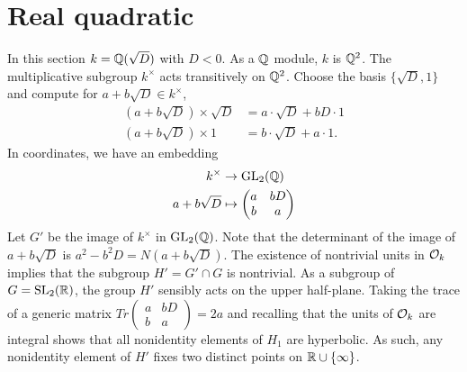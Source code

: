 \documentclass[11pt]{amsart}
\begin{document}
\section{Real quadratic}
In this section $k=\mathbb{Q}(\sqrt{D})$ with $D<0$. As a $\mathbb{Q}$ module, $k$ is $\mathbb{Q}^2$. The multiplicative subgroup $k^\times$ acts transitively on $\mathbb{Q}^2$. Choose the basis $\{\sqrt{D},1\}$ and compute for $a+b\sqrt{D}\in k^\times$,
\begin{align*}
(a+b\sqrt{D}) \times \sqrt{D}&= a\cdot \sqrt{D} + bD \cdot 1  \\
(a+b \sqrt{D}) \times 1        &=  b \cdot \sqrt{D} + a \cdot 1 .
\end{align*}
In coordinates, we have an embedding
\begin{align*}
k^\times &\to \operatorname{GL}_2(\mathbb{Q}) \\ 
a+b\sqrt{D} &\mapsto   \begin{pmatrix}
    a & b D \\ 
    b & a     \end{pmatrix}
\end{align*}
Let $G'$ be the image of $k^\times$ in $\operatorname{GL}_2(\mathbb{Q})$. Note that the determinant of the image of $a+b \sqrt{D}$ is $a^2-b^2 D=N(a+b\sqrt{D})$. The existence of nontrivial units in $\mathcal{O}_k$ implies that the subgroup $H'=G'\cap G$ is nontrivial. As a subgroup of $G=\operatorname{SL}_2(\mathbb{R})$, the group $H'$ sensibly acts on the upper half-plane. Taking the trace of a generic matrix  $ Tr \begin{pmatrix}
    a & b D \\ 
    b & a     \end{pmatrix}=2a$ and recalling that the units of $\mathcal{O}_k$ are integral shows that all nonidentity elements of $H_1$ are hyperbolic. As such, any nonidentity element of $H'$ fixes two distinct points on $\mathbb{R} \cup \{ \infty \}$.
\end{document}
